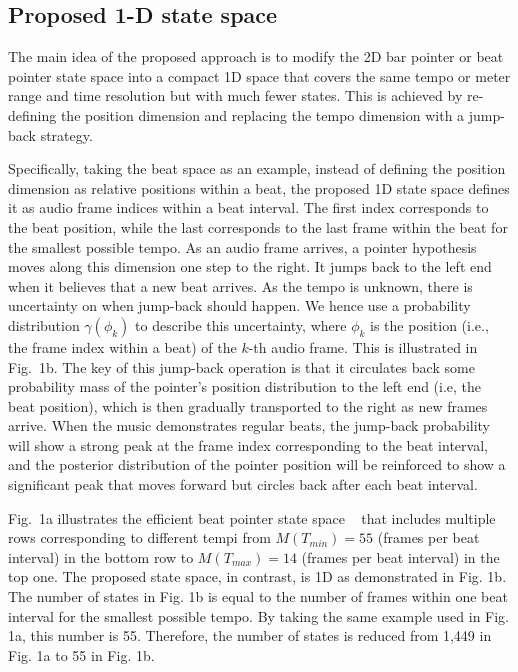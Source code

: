 \documentclass{article}
\begin{document}
\subsection{Proposed 1-D state space}
\label{ssec:1D state space}
The main idea of the proposed approach is to modify the 2D bar pointer or beat pointer state space into a compact 1D space that covers the same tempo or meter range and time resolution but with much fewer states. This is achieved by re-defining the position dimension and replacing the tempo dimension with a jump-back strategy. 

Specifically, taking the beat space as an example, instead of defining the position dimension as relative positions within a beat, the proposed 1D state space defines it as audio frame indices within a beat interval. The first index corresponds to the beat position, while the last corresponds to the last frame within the beat for the smallest possible tempo. As an audio frame arrives, a pointer hypothesis moves along this dimension one step to the right. It jumps back to the left end when it believes that a new beat arrives. As the tempo is unknown, there is uncertainty on when jump-back should happen. We hence use a probability distribution $\gamma(\phi_{k})$ to describe this uncertainty, where $\phi_{k}$ is the position (i.e., the frame index within a beat) of the $k$-th audio frame. This is illustrated in Fig.~1b. The key of this jump-back operation is that it circulates back some probability mass of the pointer's position distribution to the left end (i.e, the beat position), which is then gradually transported to the right as new frames arrive. When the music demonstrates regular beats, the jump-back probability will show a strong peak at the frame index corresponding to the beat interval, and the posterior distribution of the pointer position will be reinforced to show a significant peak that moves forward but circles back after each beat interval.
 
Fig.~1a illustrates the efficient beat pointer state space ~\cite{Krebs:1} that includes multiple rows 
corresponding to different tempi from $M(T_{min})=55$ (frames per beat interval) in the bottom row to $M(T_{max})=14$ (frames per beat interval) in the top one. The proposed state space, in contrast, is 1D as demonstrated in Fig. 1b. The number of states in Fig. 1b is equal to the number of frames within one beat interval for the smallest possible tempo. By taking the same example used in Fig. 1a, this number is 55. Therefore, the number of states is reduced from 1,449 in Fig. 1a to 55 in Fig. 1b. 
\end{document}

